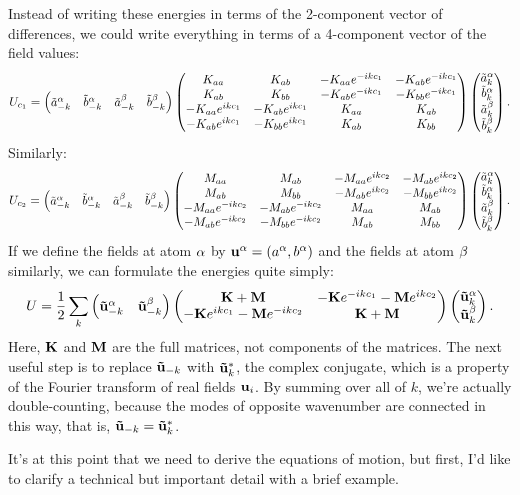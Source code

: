 \documentclass[12pt]{article}
\begin{document}
Instead of writing these energies in terms of the 2-component vector of 
differences, we could write everything in terms of a 4-component vector of the 
field values:
\[ U_{c_1} = \left(\begin{matrix}\tilde a^\alpha_{-k} & \tilde b^\alpha_{-k} & \tilde a^\beta_{-k} & 
\tilde b^\beta_{-k}\end{matrix}\right) \left(\begin{matrix} K_{aa} & K_{ab} & -K_{aa} e^{-ikc_1} & -K_{ab} 
e^{-ikc_1} \\
K_{ab} & K_{bb} & -K_{ab}e^{-ikc_1} & -K_{bb}e^{-ikc_1} \\ -K_{aa} e^{ikc_1} & 
-K_{ab} e^{ikc_1} & K_{aa} & K_{ab} \\ -K_{ab} e^{ikc_1} & -K_{bb}e^{ikc_1} 
& K_{ab} & K_{bb} \end{matrix}\right) \left(\begin{matrix}\tilde a^\alpha_k \\ \tilde b^\alpha_k \\ \tilde a^\beta_k \\ 
\tilde b^\beta_k\end{matrix}\right).\]
Similarly:
\[ U_{c_2} = \left(\begin{matrix}\tilde a^\alpha_{-k} & \tilde b^\alpha_{-k} & \tilde a^\beta_{-k} & 
\tilde b^\beta_{-k}\end{matrix}\right) \left(\begin{matrix} M_{aa} & M_{ab} & -M_{aa} e^{ikc_2} & -M_{ab} 
e^{ikc_2} \\
M_{ab} & M_{bb} & -M_{ab}e^{ikc_2} & -M_{bb}e^{ikc_2} \\ -M_{aa} e^{-ikc_2} & 
-M_{ab} e^{-ikc_2} & M_{aa} & M_{ab} \\ -M_{ab} e^{-ikc_2} & -M_{bb}e^{-ikc_2} 
& M_{ab} & M_{bb} \end{matrix}\right) \left(\begin{matrix}\tilde a^\alpha_k \\ \tilde b^\alpha_k \\ \tilde a^\beta_k \\ 
\tilde b^\beta_k\end{matrix}\right).\]
If we define the fields at atom $\alpha$ by $\mathbf{u}^\alpha = \left( a^\alpha, b^\alpha\right)$ and 
the fields at atom $\beta$ similarly, we can formulate the energies quite simply:
\[ U = \frac{1}{2} \sum_k \left(\begin{matrix} \mathbf{\tilde u}^\alpha_{-k} & \mathbf{\tilde u}^\beta_{-k}\end{matrix}\right) 
\left(\begin{matrix} \mathbf{K} + \mathbf{M} & - \mathbf{K} e^{-ikc_1} - \mathbf{M}e^{ikc_2} \\ - \mathbf{K}e^{ikc_1} - \mathbf{M}e^{-ikc_2} & 
\mathbf{K}+\mathbf{M}\end{matrix}\right) \left(\begin{matrix} \mathbf{\tilde u}^\alpha_k \\ \mathbf{\tilde u}^\beta_k \end{matrix}\right).\]
Here, $\mathbf{K}$ and $\mathbf{M}$ are the full matrices, not components of the matrices. The 
next useful step is to replace $\mathbf{\tilde u}_{-k}$ with $\mathbf{\tilde u}_k^*$, 
the complex conjugate, which is a property of the Fourier transform of real 
fields $\mathbf{u}_i$. By summing over all of $k$, we're actually double-counting, 
because the modes of opposite wavenumber are connected in this way, that is, 
$\mathbf{\tilde u}_{-k} = \mathbf{\tilde u}_k^*$.

It's at this point that we need to derive the equations of motion, but first, 
I'd like to clarify a technical but important detail with a brief example.
\end{document}

